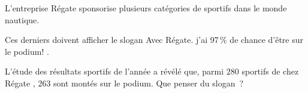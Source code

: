 \medbreak
{}
\medbreak
L'entreprise \og Régate \fg sponsorise plusieurs catégories de sportifs dans le monde nautique.
\par
Ces derniers doivent afficher le slogan \og Avec Régate. j'ai 97\,\% de chance d'être sur le podium! \fg.
\par
L'étude des résultats sportifs de l'année a révélé que, parmi $280$ sportifs de chez \og Régate \fg, $263$ sont montés sur le podium. Que penser du slogan~?
\medbreak
